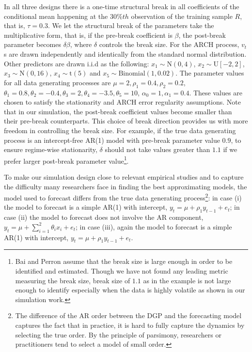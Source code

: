 In all three designs there is a one-time structural break in all coefficients of the conditional mean happening at the $30\%th$ observation of the training sample $R$, that is, $\tau = 0.3$. We let the structural break of the parameters take the multiplicative form, that is, if the pre-break coefficient is $\beta$, the post-break parameter becomes $\delta\beta$, where $\delta$ controls the break size. For the ARCH process, $v_{t}$s are drawn independently and identically from the standard normal distribution. Other predictors are drawn i.i.d as the following: $x_{1} \sim \mathrm{N}(0,4)$, $x_{2} \sim \mathrm{U}[-2,2]$, $x_{3} \sim \mathrm{N}(0,16)$, $x_{4} \sim \mathrm{t}(5)$ and $x_{5} \sim \mathrm{Binomial}(1,0.02)$. The parameter values for all data generating processes are $\mu = 2, \rho_{1} = 0.4, \rho_{2} = 0.2$, $\theta_{1} = 0.8,\theta_{2} = -0.4,\theta_{3} = 2,\theta_{4} = -3.5,\theta_{5} = 10$, $\alpha_{0} = 1, \alpha_{1} = 0.4$. These values are chosen to satisfy the stationarity and ARCH error regularity assumptions. Note that in our simulation, the post-break coefficient values become smaller than their pre-break counterparts. This choice of break direction provides us with more freedom in controlling the break size. For example, if the true data generating process is an intercept-free AR(1) model with pre-break parameter value $0.9$, to ensure regime-wise stationarity, $\delta$ should not take values greater than $1.1$ if we prefer larger post-break parameter value\footnote{Bai and Perron \cite{bai_perron98} assume that the break size is large enough in order to be identified and estimated. Though we have not found any leading metric measuring the break size, break size of $1.1$ as in the example is not large enough to identify especially when the data is highly volatile as shown in our simulation work.}.

To make our simulation design close to relevant empirical studies and to capture the difficulty many researchers face in finding the best approximating models, the model used to forecast differs from the true data generating process\footnote{The difference of the AR order between the DGP and the forecasting model captures the fact that in practice, it is hard to fully capture the dynamics by selecting the true order. By the principle of parsimony, researchers or practitioners tend to select a model of small order.}: in case (i) the model to forecast is a simple AR(1) with intercept, $y_{t} = \mu + \rho_{1}y_{t-1} + e_{t}$; in case (ii) the model to forecast does not involve the AR component, $y_{t} = \mu + \sum_{i=1}^{2}\theta_{i}x_{i} + e_{t}$; in case (iii), again the model to forecast is a simple AR(1) with intercept, $y_{t} = \mu + \rho_{1}y_{t-1} + e_{t}$.

